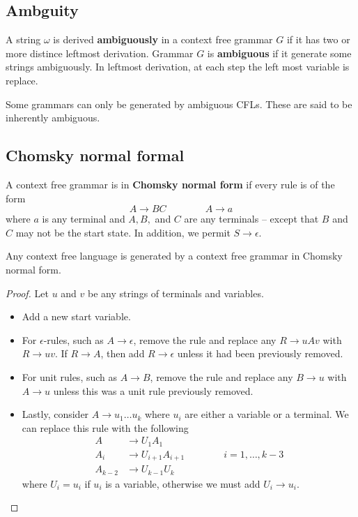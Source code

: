 \subsection{Ambguity}
A string \(\omega\) is derived \textbf{ambiguously} in a context free grammar \(G\) if it has two or more distince leftmost derivation. Grammar \(G\) is \textbf{ambiguous} if it generate some strings ambiguously. In leftmost derivation, at each step the left most variable is replace.

Some grammars can only be generated by ambiguous CFLs. These are said to be inherently ambiguous. 
\subsection{Chomsky normal formal}
\begin{definition}
    A context free grammar is in \textbf{Chomsky normal form} if every rule is of the form 
    \begin{equation*}
        A \to BC \qquad \qquad A \to a
    \end{equation*}
    where \(a\) is any terminal and \(A,B,\) and \(C\) are any terminals -- except that \(B\) and \(C\) may not be the start state. In addition, we permit \(S \rightarrow \epsilon\).
\end{definition}

\begin{theorem}
    Any context free language is generated by a context free grammar in Chomsky normal form.
\end{theorem}

\begin{proof}
    Let \(u\) and \(v\) be any strings of terminals and variables.
    \begin{itemize}
        \item Add a new start variable.
        \item For \(\epsilon\)-rules, such as \(A \rightarrow \epsilon\), remove the rule and replace any \(R \rightarrow uAv\) with \(R \rightarrow uv\). If \(R \rightarrow A\), then add \(R \rightarrow \epsilon\) unless it had been previously removed. 
        \item For unit rules, such as \(A \rightarrow B\), remove the rule and replace any \(B \rightarrow u\) with \(A \rightarrow u\) unless this was a unit rule previously removed.
        \item Lastly, consider \(A \rightarrow u_1\dots u_k\) where \(u_i\) are either a variable or a terminal. We can replace this rule with the following 
        \begin{align*}
            A &\to U_1 A_1\\
            A_i &\to U_{i+1} A_{i+1}\qquad \qquad i = 1, \dots , k-3\\
            A_{k-2} &\to U_{k-1}U_{k}
        \end{align*} 
        where \(U_i = u_i\) if \(u_i\) is a variable, otherwise we must add \(U_i \rightarrow u_i\).
    \end{itemize}
\end{proof}

